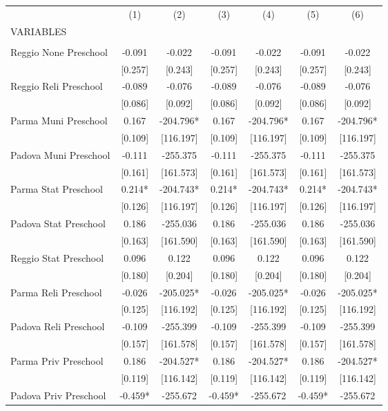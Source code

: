 \begin{tabular}{lcccccc} \hline
 & (1) & (2) & (3) & (4) & (5) & (6) \\
VARIABLES &  &  &  &  &  &  \\ \hline
 &  &  &  &  &  &  \\
Reggio None Preschool & -0.091 & -0.022 & -0.091 & -0.022 & -0.091 & -0.022 \\
 & [0.257] & [0.243] & [0.257] & [0.243] & [0.257] & [0.243] \\
Reggio Reli Preschool & -0.089 & -0.076 & -0.089 & -0.076 & -0.089 & -0.076 \\
 & [0.086] & [0.092] & [0.086] & [0.092] & [0.086] & [0.092] \\
Parma Muni Preschool & 0.167 & -204.796* & 0.167 & -204.796* & 0.167 & -204.796* \\
 & [0.109] & [116.197] & [0.109] & [116.197] & [0.109] & [116.197] \\
Padova Muni Preschool & -0.111 & -255.375 & -0.111 & -255.375 & -0.111 & -255.375 \\
 & [0.161] & [161.573] & [0.161] & [161.573] & [0.161] & [161.573] \\
Parma Stat Preschool & 0.214* & -204.743* & 0.214* & -204.743* & 0.214* & -204.743* \\
 & [0.126] & [116.197] & [0.126] & [116.197] & [0.126] & [116.197] \\
Padova Stat Preschool & 0.186 & -255.036 & 0.186 & -255.036 & 0.186 & -255.036 \\
 & [0.163] & [161.590] & [0.163] & [161.590] & [0.163] & [161.590] \\
Reggio Stat Preschool & 0.096 & 0.122 & 0.096 & 0.122 & 0.096 & 0.122 \\
 & [0.180] & [0.204] & [0.180] & [0.204] & [0.180] & [0.204] \\
Parma Reli Preschool & -0.026 & -205.025* & -0.026 & -205.025* & -0.026 & -205.025* \\
 & [0.125] & [116.192] & [0.125] & [116.192] & [0.125] & [116.192] \\
Padova Reli Preschool & -0.109 & -255.399 & -0.109 & -255.399 & -0.109 & -255.399 \\
 & [0.157] & [161.578] & [0.157] & [161.578] & [0.157] & [161.578] \\
Parma Priv Preschool & 0.186 & -204.527* & 0.186 & -204.527* & 0.186 & -204.527* \\
 & [0.119] & [116.142] & [0.119] & [116.142] & [0.119] & [116.142] \\
Padova Priv Preschool & -0.459* & -255.672 & -0.459* & -255.672 & -0.459* & -255.672 \\

\end{tabular}
